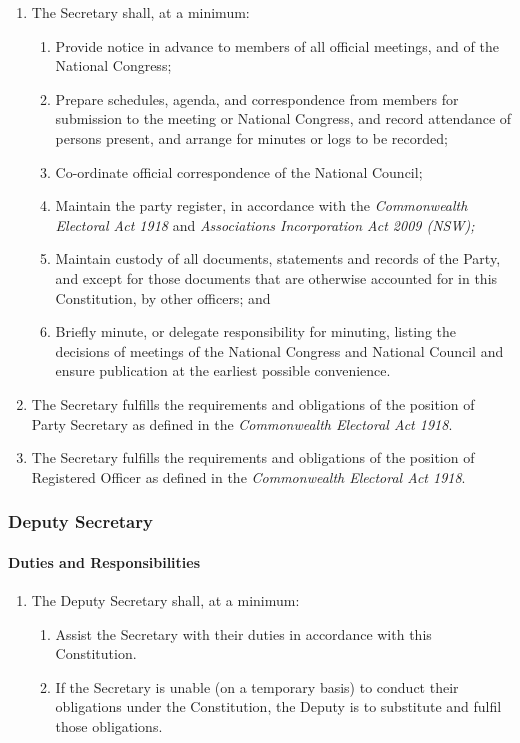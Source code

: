 \documentclass[a4paper,titlepage,8.5pt]{article}
\begin{document}
\begin{enumerate}
\item The Secretary shall, at a minimum:
\begin{enumerate}
\item Provide notice in advance to members of all official meetings, and of the National Congress;
\item Prepare schedules, agenda, and correspondence from members for submission to the meeting or National Congress, and record attendance of persons present, and arrange for minutes or logs to be recorded;
\item Co-ordinate official correspondence of the National Council;
\item Maintain the party register, in accordance with the \textit{Commonwealth Electoral Act 1918} and \textit{Associations Incorporation Act 2009 (NSW);}
\item Maintain custody of all documents, statements and records of the Party, and except for those documents that are otherwise accounted for in this Constitution, by other officers; and
\item Briefly minute, or delegate responsibility for minuting, listing the decisions of meetings of the National Congress and National Council and ensure publication at the earliest possible convenience.
\end{enumerate}
\item The Secretary fulfills the requirements and obligations of the position of Party Secretary as defined in the \textit{Commonwealth Electoral Act 1918}.
\item The Secretary fulfills the requirements and obligations of the position of Registered Officer as defined in the \textit{Commonwealth Electoral Act 1918}.
\end{enumerate}

\subsubsection{Deputy Secretary}

\paragraph{Duties and Responsibilities}

\begin{enumerate}
\item The Deputy Secretary shall, at a minimum:
\begin{enumerate}
\item Assist the Secretary with their duties in accordance with this Constitution.
\item If the Secretary is unable (on a temporary basis) to conduct their obligations under the Constitution, the Deputy is to substitute and fulfil those obligations.
\end{enumerate}
\end{enumerate}
\end{document}
